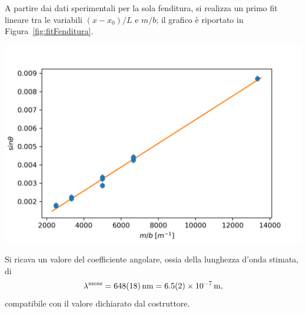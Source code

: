 \documentclass[10pt,oneside,a4paper]{article}
\newenvironment{Figure}
  {\par\medskip\noindent\minipage{\linewidth}}
  {\endminipage\par\medskip}
\begin{document}
\begin{multicols}{2}
A partire dai dati sperimentali per la sola fenditura, si realizza un primo fit lineare tra le variabili $(x-x_0) / L$ e $m/b$; il grafico è riportato in Figura~\ref{fig:fitFenditura}. 

\begin{Figure}
	\begin{center}
	\includegraphics[width=1.1\linewidth]{fitFenditura.png}
	\label{fig:fitFenditura}
	\end{center}
\end{Figure}

Si ricava un valore del coefficiente angolare, ossia della lunghezza d'onda stimata, di
\[
\lambda^{\text{meas}} = \SI{648 \pm 18}{nm} = \SI{6.5 \pm 0.2 e-7}{m},
\]
compatibile con il valore dichiarato dal costruttore. 


\end{multicols}
\end{document}

